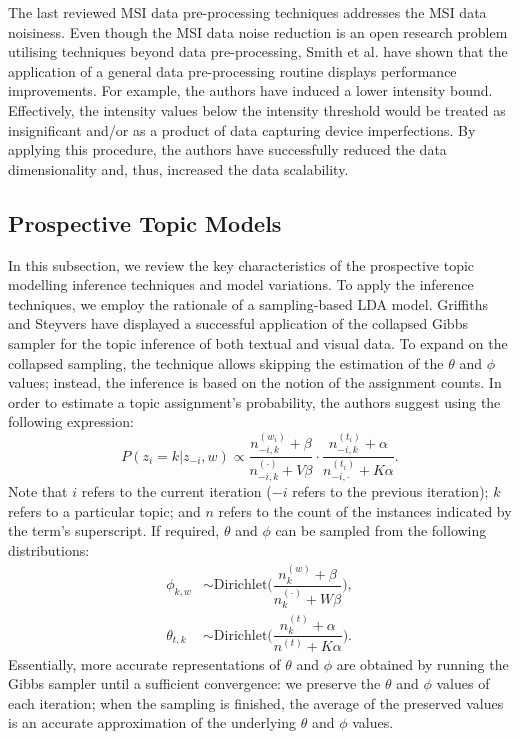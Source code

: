 \documentclass{mpaper}
\begin{document}
\par The last reviewed MSI data pre-processing techniques addresses the MSI data noisiness. Even though the MSI data noise reduction is an open research problem utilising techniques beyond data pre-processing, Smith et al. \cite{smith2014proteomics} have shown that the application of a general data pre-processing routine displays performance improvements. For example, the authors have induced a lower intensity bound. Effectively, the intensity values below the intensity threshold would be treated as insignificant and/or as a product of data capturing device imperfections. By applying this procedure, the authors have successfully reduced the data dimensionality and, thus, increased the data scalability.

\subsection{Prospective Topic Models}

\par In this subsection, we review the key characteristics of the prospective topic modelling inference techniques and model variations. To apply the inference techniques, we employ the rationale of a sampling-based LDA model. Griffiths and Steyvers \cite{griffiths2004finding} have displayed a successful application of the collapsed Gibbs sampler for the topic inference of both textual and visual data. To expand on the collapsed sampling, the technique allows skipping the estimation of the $\theta$ and $\phi$ values; instead, the inference is based on the notion of the assignment counts. In order to estimate a topic assignment's probability, the authors suggest using the following expression:
\begin{equation*}
P(z_i = k | z_{-i}, w) \propto \dfrac{n_{-i, k}^{(w_i)} + \beta}{n_{-i, k}^{(\cdot)} + V\beta}\cdot \dfrac{n_{-i, k}^{(t_i)} + \alpha}{n_{-i, \cdot}^{(t_i)} + K\alpha}.
\end{equation*}
Note that $i$ refers to the current iteration ($-i$ refers to the previous iteration); $k$ refers to a particular topic; and $n$ refers to the count of the instances indicated by the term's superscript. If required, $\theta$ and $\phi$ can be sampled from the following distributions:
\begin{align*}
\phi_{k,w} & \sim \mbox{Dirichlet}\bigg(\dfrac{n_{k}^{(w)} + \beta}{n_{k}^{(\cdot)} + W\beta}\bigg),\\
\theta_{t,k} & \sim \mbox{Dirichlet}\bigg(\dfrac{n_{k}^{(t)} + \alpha}{n^{(t)} + K\alpha}\bigg).
\end{align*}
Essentially, more accurate representations of $\theta$ and $\phi$ are obtained by running the Gibbs sampler until a sufficient convergence: we preserve the $\theta$ and $\phi$ values of each iteration; when the sampling is finished, the average of the preserved values is an accurate approximation of the underlying $\theta$ and $\phi$ values.
\end{document}
